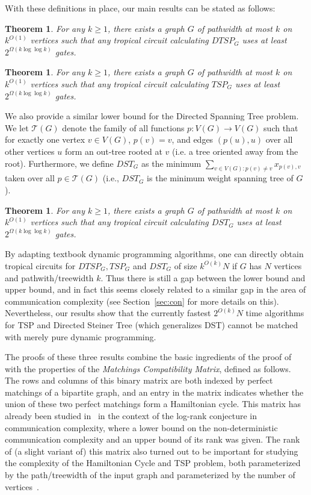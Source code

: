 \documentclass[11pt,a4paper]{article}
\newtheorem{theorem}[lemma]{Theorem}
\begin{document}
With these definitions in place, our main results can be stated as follows:
\begin{theorem}\label{thm:main_dtsp}
    For any $k \geq 1$, there exists a graph $G$ of pathwidth at most $k$ on $k^{O(1)}$ vertices such that any tropical circuit calculating $DTSP_G$ uses at least $2^{\Omega(k \log \log k)}$ gates.
\end{theorem}


\begin{theorem}\label{thm:main_tsp}
    For any $k \geq 1$, there exists a graph $G$ of pathwidth at most $k$ on $k^{O(1)}$ vertices such that any tropical circuit calculating $TSP_{G}$ uses at least $2^{\Omega(k \log \log k)}$ gates.
\end{theorem}

We also provide a similar lower bound for the Directed Spanning Tree problem.
We let $\mathcal{T}(G)$ denote the family of all functions $p : V(G) \to V(G)$ such that for exactly one vertex $v \in V(G)$, $p(v) = v$, and edges $(p(u), u)$ over all other vertices $u$ form an out-tree rooted at $v$ (i.e. a tree oriented away from the root). Furthermore, we define $DST_G$ as the minimum $\sum_{v \in V(G) : p(v) \neq v} x_{p(v), v}$ taken over all $p \in \mathcal{T}(G)$ (i.e., $DST_G$ is the minimum weight spanning tree of $G$).

\begin{theorem}\label{thm:main_dst}
    For any $k \geq 1$, there exists a graph $G$ of pathwidth at most $k$ on $k^{O(1)}$ vertices such that any tropical circuit calculating $DST_{G}$ uses at least $2^{\Omega(k \log \log k)}$ gates.
\end{theorem}

By adapting textbook dynamic programming algorithms, one can directly obtain tropical circuits for $DTSP_G,TSP_G$ and $DST_G$ of size $k^{O(k)} N$ if $G$ has $N$ vertices and pathwith/treewidth $k$. Thus there is still a gap between the lower bound and upper bound, and in fact this seems closely related to a similar gap in the area of communication complexity (see Section~\ref{sec:con} for more details on this). Nevertheless, our results show that the currently fastest $2^{O(k)}N$ time algorithms for TSP and Directed Steiner Tree (which generalizes DST) cannot be matched with merely pure dynamic programming.

The proofs of these three results combine the basic ingredients of the proof of  with the properties of the \emph{Matchings Compatibility Matrix}, defined as follows. The rows and columns of this binary matrix are both indexed by perfect matchings of a bipartite graph, and an entry in the matrix indicates whether the union of these two perfect matchings form a Hamiltonian cycle. This matrix has already been studied in~\cite{raz1995log} in the context of the log-rank conjecture in communication complexity, where a lower bound on the non-deterministic communication complexity and an upper bound of its rank was given. The rank of (a slight variant of) this matrix also turned out to be important for studying the complexity of the Hamiltonian Cycle and TSP problem, both parameterized by the path/treewidth of the input graph and parameterized by the number of vertices~\cite{CurticapeanLN18,CyganKN18,Nederlof20}.
\end{document}

